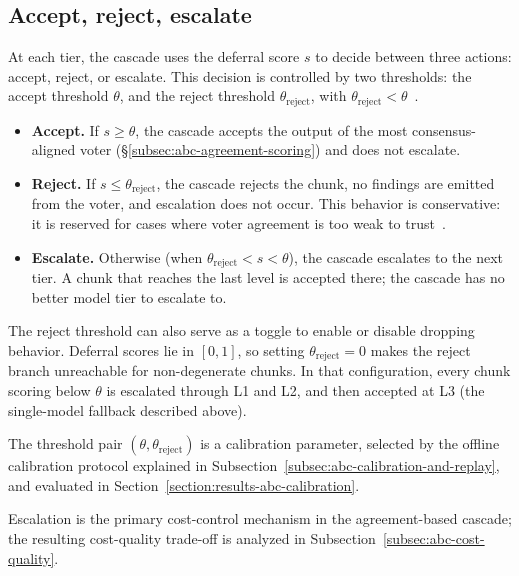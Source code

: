 \subsection{Accept, reject, escalate}\label{subsec:abc-accept-reject-escalate}

At each tier, the cascade uses the deferral score $s$ to decide between three actions: accept, reject, or escalate. This decision is controlled by two thresholds: the accept threshold $\theta$, and the reject threshold $\theta_{\mathrm{reject}}$, with $\theta_{\mathrm{reject}} < \theta$~\parencite{kolawole2025abc, chen2023frugalgpt}. 

\begin{itemize}[label={},leftmargin=1.5em]
    \item \textbf{Accept.} If $s \geq \theta$, the cascade accepts the output of the most consensus-aligned voter (§\ref{subsec:abc-agreement-scoring}) and does not escalate.

    \item \textbf{Reject.} If $s \leq \theta_{\mathrm{reject}}$, the cascade rejects the chunk, no findings are emitted from the voter, and escalation does not occur. This behavior is conservative: it is reserved for cases where voter agreement is too weak to trust~\parencite{el-yaniv2010foundationsnoisefreeselective}.
    
    \item \textbf{Escalate.} Otherwise (when $\theta_{\mathrm{reject}} < s < \theta$), the cascade escalates to the next tier. A chunk that reaches the last level is accepted there; the cascade has no better model tier to escalate to.
\end{itemize}

The reject threshold can also serve as a toggle to enable or disable dropping behavior. Deferral scores lie in $[0,1]$, so setting $\theta_{\mathrm{reject}} = 0$ makes the reject branch unreachable for non-degenerate chunks. In that configuration, every chunk scoring below $\theta$ is escalated through L1 and L2, and then accepted at L3 (the single-model fallback described above).

The threshold pair $(\theta, \theta_{\mathrm{reject}})$ is a calibration parameter, selected by the offline calibration protocol explained in Subsection~\ref{subsec:abc-calibration-and-replay}, and evaluated in Section~\ref{section:results-abc-calibration}. 

Escalation is the primary cost-control mechanism in the agreement-based cascade; the resulting cost-quality trade-off is analyzed in Subsection~\ref{subsec:abc-cost-quality}.